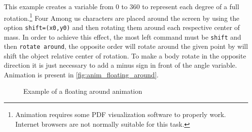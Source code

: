 \documentclass[12pt]{article}
\begin{document}
This example creates a variable from 0 to 360 to represent each degree of a full rotation.\footnote{Animation requires some PDF visualization software to properly work. Internet browsers are not normally suitable for this task.} Four Among us characters are placed around the screen by using the option \texttt{shift={(x0,y0)}} and then rotating them around each respective center of mass. In order to achieve this effect, the most left command must be \texttt{shift} and then \texttt{rotate around}, the opposite order will rotate around the given point by will shift the object relative center of rotation. To make a body rotate in the opposite direction it is just necessary to add a minus sign in front of the angle variable. Animation is present in \autoref{fig:anim_floating_around}.
\begin{FHZtcbAmongUs}
\begin{animateinline}{30}
\end{animateinline}
\end{FHZtcbAmongUs}


\begin{figure}[ht!]
  \begin{animateinline}{30}
  \end{animateinline}
  \caption{Example of a floating around animation}
  \label{fig:anim_floating_around}
\end{figure}
\end{document}
